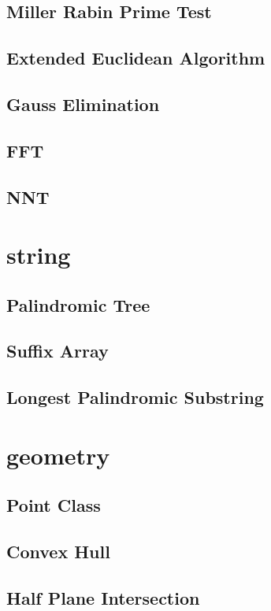 \documentclass[10pt,twocolumn,oneside]{article}
\begin{document}
\subsection{Miller Rabin Prime Test}

\subsection{Extended Euclidean Algorithm}

\subsection{Gauss Elimination}

\subsection{FFT}

\subsection{NNT}


\section{string}
\subsection{Palindromic Tree}

\subsection{Suffix Array}

\subsection{Longest Palindromic Substring}


\section{geometry}
\subsection{Point Class}

\subsection{Convex Hull}

\subsection{Half Plane Intersection}

\end{document}

